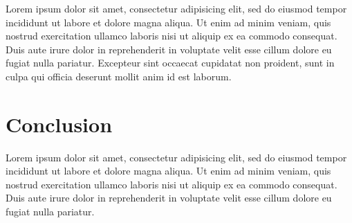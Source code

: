 \documentclass{article}
\begin{document}
Lorem ipsum dolor sit amet, consectetur adipisicing elit, sed do eiusmod tempor
incididunt ut labore et dolore magna aliqua. Ut enim ad minim veniam, quis
nostrud exercitation ullamco laboris nisi ut aliquip ex ea commodo consequat.
Duis aute irure dolor in reprehenderit in voluptate velit esse cillum dolore eu
fugiat nulla pariatur. Excepteur sint occaecat cupidatat non proident, sunt in
culpa qui officia deserunt mollit anim id est laborum.

\section{Conclusion}

Lorem ipsum dolor sit amet, consectetur adipisicing elit, sed do eiusmod tempor
incididunt ut labore et dolore magna aliqua. Ut enim ad minim veniam, quis
nostrud exercitation ullamco laboris nisi ut aliquip ex ea commodo consequat.
Duis aute irure dolor in reprehenderit in voluptate velit esse cillum dolore eu
fugiat nulla pariatur.
\end{document}
